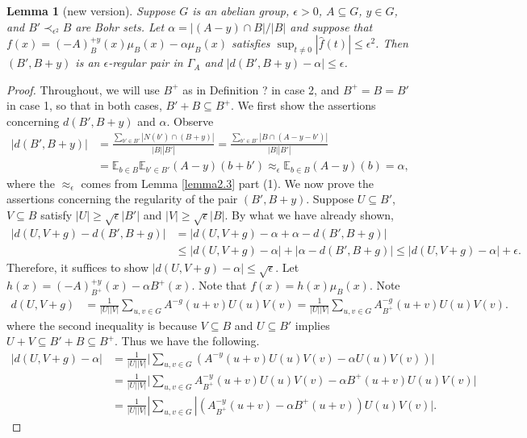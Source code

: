 \documentclass[11pt]{article}
\newtheorem{lemma}{Lemma}
\theoremstyle{definition}
\begin{document}
\begin{lemma}[new version]\label{reg}
Suppose $G$ is an abelian group, $\epsilon>0$, $A\subseteq G$, $y\in G$, and $B'\prec_{\epsilon^2} B$ are Bohr sets.  Let $\alpha = |(A-y)\cap B|/|B|$ and suppose that $f(x)=(-A)^{+y}_B(x)\mu_B(x)-\alpha \mu_B(x)$ satisfies $\sup_{t\neq 0}|\widehat{f}(t)|\leq \epsilon^2$.  Then $(B',B+y)$ is an $\epsilon$-regular pair in $\Gamma_A$ and $|d(B',B+y)-\alpha|\leq \epsilon$. 
\end{lemma}
\begin{proof}
Throughout, we will use $B^+$ as in Definition ? in case 2, and $B^+=B=B'$ in case 1, so that in both cases, $B'+B\subseteq B^+$.  We first show the assertions concerning $d(B',B+y)$ and $\alpha$.  Observe
\begin{align}\label{count}
|d(B',B+y)|&=\frac{\sum_{b'\in B'} |N(b')\cap (B+y)|}{|B||B'|}=\frac{\sum_{b'\in B'} |B\cap (A-y-b')|}{|B||B'|}\\
&=\mathbb{E}_{b\in B}\mathbb{E}_{b'\in B'}(A-y)(b+b')\approx_{\epsilon} \mathbb{E}_{b\in B}(A-y)(b)=\alpha,
\end{align}
where the $\approx_{\epsilon}$ comes from Lemma \ref{lemma2.3} part (1).  We now prove the assertions concerning the regularity of the pair $(B',B+y)$.  Suppose $U\subseteq B'$, $V\subseteq B$ satisfy $|U|\geq \sqrt{\epsilon}|B'|$ and $|V|\geq \sqrt{\epsilon}|B|$.  By what we have already shown, 
\begin{align*}
|d(U,V+g)-d(B',B+g)|&=|d(U,V+g)-\alpha+\alpha-d(B',B+g)|\\
&\leq |d(U,V+g)-\alpha|+|\alpha-d(B',B+g)|\leq |d(U,V+g)-\alpha|+\epsilon.
\end{align*}
Therefore, it suffices to show $|d(U,V+g)-\alpha|\leq \sqrt{\epsilon}$.  Let $h(x)=(-A)_{B^+}^{+y}(x)-\alpha B^+(x)$.  Note that $f(x)=h(x)\mu_B(x)$.  Note
\begin{align*}
d(U,V+g)&=\frac{1}{|U||V|}\sum_{u,v\in G}A^{-g}(u+v)U(u)V(v)=\frac{1}{|U||V|}\sum_{u,v\in G}A_{B^+}^{-g}(u+v)U(u)V(v).
\end{align*}
where the second inequality is because $V\subseteq B$ and $U\subseteq B'$ implies $U+V\subseteq B'+B\subseteq B^+$. Thus we have the following.
\begin{align*}
|d(U,V+g)-\alpha|&=\frac{1}{|U||V|}\Big|\sum_{u,v\in G}(A^{-y}(u+v)U(u)V(v)-\alpha U(u)V(v))\Big|\\
&=\frac{1}{|U||V|}\Big|\sum_{u,v\in G}A_{B^+}^{-y}(u+v)U(u)V(v)-\alpha B^{+}(u+v)U(u)V(v)\Big|\\
&= \frac{1}{|U||V|}|\sum_{u,v\in G}|(A_{B^+}^{-y}(u+v)-\alpha B^{+}(u+v))U(u)V(v)|.

\end{align*}
\end{proof}
\end{document}
